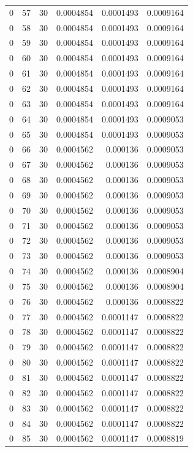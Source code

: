 \begin{tabular}{rrrrrr}
0 & 57 & 30 & 0.0004854 & 0.0001493 & 0.0009164 \\
0 & 58 & 30 & 0.0004854 & 0.0001493 & 0.0009164 \\
0 & 59 & 30 & 0.0004854 & 0.0001493 & 0.0009164 \\
0 & 60 & 30 & 0.0004854 & 0.0001493 & 0.0009164 \\
0 & 61 & 30 & 0.0004854 & 0.0001493 & 0.0009164 \\
0 & 62 & 30 & 0.0004854 & 0.0001493 & 0.0009164 \\
0 & 63 & 30 & 0.0004854 & 0.0001493 & 0.0009164 \\
0 & 64 & 30 & 0.0004854 & 0.0001493 & 0.0009053 \\
0 & 65 & 30 & 0.0004854 & 0.0001493 & 0.0009053 \\
0 & 66 & 30 & 0.0004562 & 0.000136 & 0.0009053 \\
0 & 67 & 30 & 0.0004562 & 0.000136 & 0.0009053 \\
0 & 68 & 30 & 0.0004562 & 0.000136 & 0.0009053 \\
0 & 69 & 30 & 0.0004562 & 0.000136 & 0.0009053 \\
0 & 70 & 30 & 0.0004562 & 0.000136 & 0.0009053 \\
0 & 71 & 30 & 0.0004562 & 0.000136 & 0.0009053 \\
0 & 72 & 30 & 0.0004562 & 0.000136 & 0.0009053 \\
0 & 73 & 30 & 0.0004562 & 0.000136 & 0.0009053 \\
0 & 74 & 30 & 0.0004562 & 0.000136 & 0.0008904 \\
0 & 75 & 30 & 0.0004562 & 0.000136 & 0.0008904 \\
0 & 76 & 30 & 0.0004562 & 0.000136 & 0.0008822 \\
0 & 77 & 30 & 0.0004562 & 0.0001147 & 0.0008822 \\
0 & 78 & 30 & 0.0004562 & 0.0001147 & 0.0008822 \\
0 & 79 & 30 & 0.0004562 & 0.0001147 & 0.0008822 \\
0 & 80 & 30 & 0.0004562 & 0.0001147 & 0.0008822 \\
0 & 81 & 30 & 0.0004562 & 0.0001147 & 0.0008822 \\
0 & 82 & 30 & 0.0004562 & 0.0001147 & 0.0008822 \\
0 & 83 & 30 & 0.0004562 & 0.0001147 & 0.0008822 \\
0 & 84 & 30 & 0.0004562 & 0.0001147 & 0.0008822 \\
0 & 85 & 30 & 0.0004562 & 0.0001147 & 0.0008819 \\

\end{tabular}
